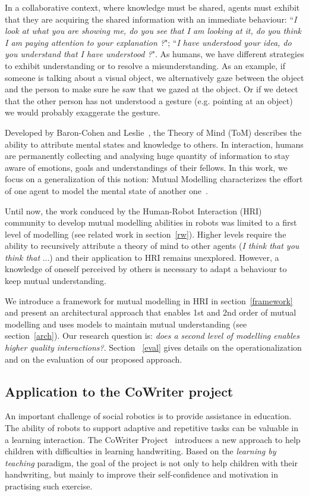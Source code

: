 \documentclass[10pt,a4paper]{article}
\begin{document}
In a collaborative context, where knowledge must be shared, agents must exhibit that they are acquiring the shared information with an immediate behaviour: ``\textit{I look at what you are showing me, do you see that I am looking at it, do you think I am paying attention to your explanation ?}"; ``\textit{I have understood your idea, do you understand that I have understood ?}". 
As humans, we have different strategies to exhibit understanding or to resolve a misunderstanding. 
As an example, if someone is talking about a visual object, we alternatively gaze between the object and the person to make sure he saw that we gazed at the object. Or if we detect that the other person has not understood a gesture (e.g. pointing at an object) we would probably exaggerate the gesture.

Developed by Baron-Cohen and Leslie~\cite{baron1985does}, the Theory of Mind (ToM) describes the ability to attribute mental states and knowledge to others. In interaction, humans are permanently collecting and analysing huge quantity of information to stay aware of emotions, goals and understandings of their fellows. In this work, we focus on a generalization of this notion: Mutual Modelling characterizes the effort of one agent to model the mental state of another one~\cite{dillenbourg1999you}. 

Until now, the work conduced by the Human-Robot Interaction (HRI) community to develop mutual modelling abilities in robots was limited to a first level of modelling (see related work in section~\ref{rw}). Higher levels require the ability to recursively attribute a theory of mind to other agents (\textit{I think that you think that} ...) and their application to HRI remains unexplored. However, a knowledge of oneself perceived by others is necessary to adapt a behaviour to keep mutual understanding. 

We introduce a framework for mutual modelling in HRI in section~\ref{framework} and present an  architectural approach that enables 1st and 2nd order of mutual modelling and uses models to maintain mutual understanding (see section~\ref{arch}).
Our research question is: \textit{does a second level of modelling enables higher quality interactions?}. 
Section ~\ref{eval} gives details on the operationalization and on the evaluation of our proposed approach.

\subsection{Application to the CoWriter project}
An important challenge of social robotics is to provide assistance in education. 
The ability of robots to support adaptive and repetitive tasks can be valuable in a learning interaction.
The CoWriter Project~\cite{Hood,jacq2016building} introduces a new approach to help children with difficulties in learning handwriting. 
Based on the \emph{learning by teaching} paradigm, the goal of the project is not only to help children with their handwriting, but mainly to improve their self-confidence and motivation in practising such exercise.
\end{document}
